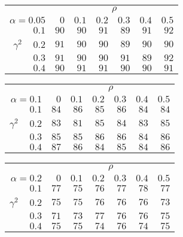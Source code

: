 \begin{tabular}{r|rrrrrr}
\hline\hline
 &\multicolumn{6}{c}{$\rho$} \\ 
 $\alpha = 0.05$ & $0$ & $0.1$ & $0.2$ & $0.3$ & $0.4$ & $0.5$ \\ 
 \hline$0.1$ & $90$ & $90$ & $91$ & $89$ & $91$ & $92$\\ 
$\gamma^2\;\;\;$ $0.2$ & $91$ & $90$ & $90$ & $89$ & $90$ & $90$\\ 
$0.3$ & $91$ & $90$ & $90$ & $91$ & $89$ & $92$\\ 
$0.4$ & $90$ & $91$ & $91$ & $90$ & $90$ & $91$\\ 
 \hline 
 \end{tabular}
 
 \vspace{2em} 
 
\begin{tabular}{r|rrrrrr}
\hline\hline
 &\multicolumn{6}{c}{$\rho$} \\ 
 $\alpha = 0.1$ & $0$ & $0.1$ & $0.2$ & $0.3$ & $0.4$ & $0.5$ \\ 
 \hline$0.1$ & $84$ & $86$ & $85$ & $86$ & $84$ & $84$\\ 
$\gamma^2\;\;\;$ $0.2$ & $83$ & $81$ & $85$ & $84$ & $83$ & $85$\\ 
$0.3$ & $85$ & $85$ & $86$ & $86$ & $84$ & $86$\\ 
$0.4$ & $87$ & $86$ & $84$ & $85$ & $84$ & $86$\\ 
 \hline 
 \end{tabular}
 
 \vspace{2em} 
 
\begin{tabular}{r|rrrrrr}
\hline\hline
 &\multicolumn{6}{c}{$\rho$} \\ 
 $\alpha = 0.2$ & $0$ & $0.1$ & $0.2$ & $0.3$ & $0.4$ & $0.5$ \\ 
 \hline$0.1$ & $77$ & $75$ & $76$ & $77$ & $78$ & $77$\\ 
$\gamma^2\;\;\;$ $0.2$ & $75$ & $75$ & $76$ & $76$ & $76$ & $73$\\ 
$0.3$ & $71$ & $73$ & $77$ & $76$ & $76$ & $75$\\ 
$0.4$ & $75$ & $75$ & $74$ & $76$ & $74$ & $75$\\ 
 \hline 
 \end{tabular}